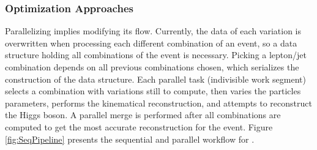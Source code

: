 \subsubsection*{Optimization Approaches}

Parallelizing \ttDilepKinFit implies modifying its flow. Currently, the data of each variation is overwritten when processing each different combination of an event, so a data structure holding all combinations of the event is necessary. Picking a lepton/jet combination depends on all previous combinations chosen, which serializes the construction of the data structure. Each parallel task (indivisible work segment) selects a combination with variations still to compute, then varies the particles parameters, performs the kinematical reconstruction, and attempts to reconstruct the Higgs boson. A parallel merge is performed after all combinations are computed to get the most accurate reconstruction for the event. Figure \ref{fig:SeqPipeline} presents the sequential and parallel workflow for \ttDilepKinFit.

